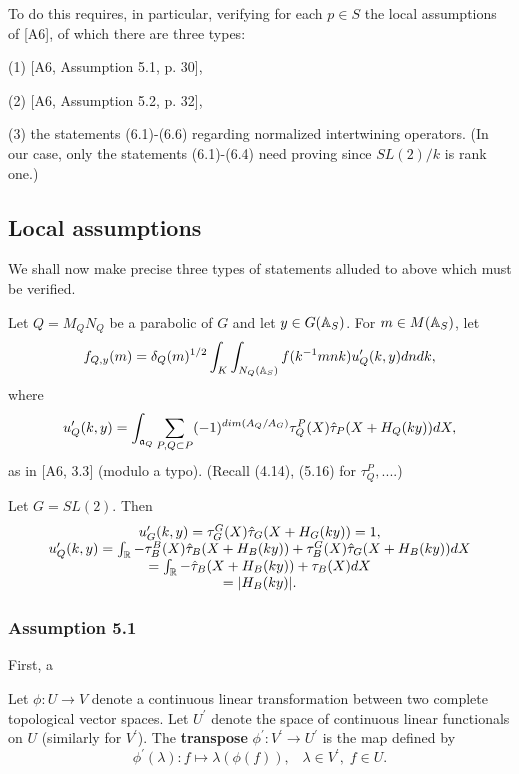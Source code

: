 To do this requires, in particular, verifying for each $p\in S$ the local
assumptions of [A6], of which there are three types:

(1) [A6, Assumption 5.1, p. 30],

(2) [A6, Assumption 5.2, p. 32],

(3) the statements (6.1)-(6.6) regarding normalized intertwining operators.
(In our case, only the statements (6.1)-(6.4) need proving since
$SL(2)/k$ is rank one.)

\subsection{Local assumptions}

We shall now make precise three types of statements alluded to
above which must be verified.

Let $Q=M_Q N_Q$ be a parabolic of $G$ and let $y\in G({\Bbb{A}}_S)$.
For $m\in M({\Bbb{A}}_S)$, let
\begin{equation}
f_{Q,y}(m)=\delta_Q(m)^{1/2}\int_K\int_{N_Q({\Bbb{A}}_S)}
f(k^{-1}mnk)u'_Q(k,y)dndk,
\end{equation}
where
\[
u'_Q(k,y)=\int_{{\frak{a}}_Q}
\sum_{ P ,Q\subset P}
(-1)^{dim(A_Q/A_G)}
\tau_Q^P(X)\hat{\tau}_P(X+H_Q(ky))dX ,
\]
as in [A6, {3.3}] (modulo a typo).
(Recall (4.14), (5.16) for $\tau_Q^P,...$.)
\begin{example} Let $G=SL(2)$. Then
\[
\begin{array}{c}
u'_G(k,y)=\tau_G^G(X)\hat{\tau}_G(X+H_G(ky))=1,\\
u'_Q(k,y)=\int_{{\Bbb{R}}}
-\tau_B^B(X)\hat{\tau}_B(X+H_B(ky))
+\tau_B^G(X)\hat{\tau}_G(X+H_B(ky)) dX \\
=\int_{{\Bbb{R}}}
-\hat{\tau}_B(X+H_B(ky))+\tau_B(X)dX\\
=|H_B(ky)|.
\end{array}
\]
\end{example}

\subsubsection{Assumption 5.1}

First, a

\begin{definition}
Let $\phi :U\rightarrow V$ denote a continuous linear transformation between
two complete topological vector spaces. Let $U^{\prime }$ denote the space
of continuous linear functionals on $U$ (similarly for $V^{\prime }$). The 
{\bf transpose} $\phi ^{\prime }:V^{\prime }\rightarrow U^{\prime }$ is the
map defined by 
\[
\phi ^{\prime }(\lambda ):f\longmapsto \lambda (\phi (f)),\;\;\;\lambda \in
V^{\prime },\;f\in U. 
\]
\end{definition}


